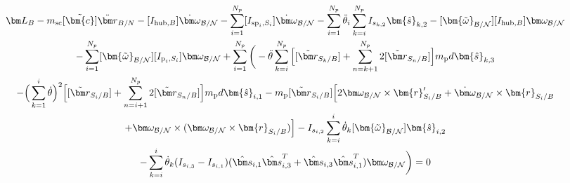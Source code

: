 \begin{multline}
	\bm L_B - m_{\text{sc}}[\tilde{\bm{c}}]\ddot{\bm r}_{B/N} -[I_{\text{hub},B}] \dot{\bm\omega}_{\cal B/N} - \sum\limits_{i=1}^{N_p}[I_{\text{sp}_i,S_i}] \dot{\bm\omega}_{\cal B/N} - \sum\limits_{i=1}^{N_p} \ddot{\theta}_i \sum^{N_p}_{k=i}I_{s_{k,2}} \bm{\hat{s}}_{k,2} -[\bm{\tilde{\omega}}_{\cal B/N}] [I_{\text{hub},B}] \bm\omega_{\cal B/N} \\
	- \sum\limits_{i=1}^{N_p}[\bm{\tilde{\omega}}_{\cal B/N}] [I_{\text{p}_i,S_i}] \bm\omega_{\cal B/N}
	+ \sum\limits_{i=1}^{N_p}\bigg( - \ddot{\theta}\sum\limits_{k=i}^{N_p}\Big[ [\tilde{{\bm r}}_{S_{k}/B}] + \sum\limits_{n=k+1}^{N_p}2[\tilde{{\bm r}}_{S_{n}/B}]\Big]m_{\text{p}} d \bm{\hat{s}}_{k,3} \\
	- \Big( \sum\limits_{k=1}^{i} \dot{\theta}\Big)^2 \Big[[\tilde{{\bm r}}_{S_{i}/B}] + \sum\limits_{n=i+1}^{N_p}2[\tilde{{\bm r}}_{S_{n}/B}]\Big] m_{\text{p}} d \bm{\hat{s}}_{i,1}
	- m_{\text{p}} [\tilde{{\bm r}}_{S_{i}/B}] \Big[
	2 \bm\omega_{\cal B/N} \times \bm{r}'_{S_i/B} +  \dot{\bm\omega}_{\cal B/N} \times \bm{r}_{S_i/B}
	\\
	+ \bm\omega_{\cal B/N} \times (\bm\omega_{\cal B/N} \times \bm{r}_{S_i/B})\Big]
	- I_{s_{i,2}} \sum^{i}_{k=i} \dot{\theta}_k [\bm{\tilde{\omega}}_{\cal B/N}] \bm{\hat{s}}_{i,2} \\
	-\sum^{i}_{k=i} \dot{\theta}_k (I_{s_{i,3}}-I_{s_{i,1}})(\hat{\bm s}_{i,1}\hat{\bm s}_{i,3}^{T}+\hat{\bm s}_{i,3}\hat{\bm s}_{i,1}^{T}) \bm\omega_{\cal B/N} \bigg) = 0
\end{multline}

